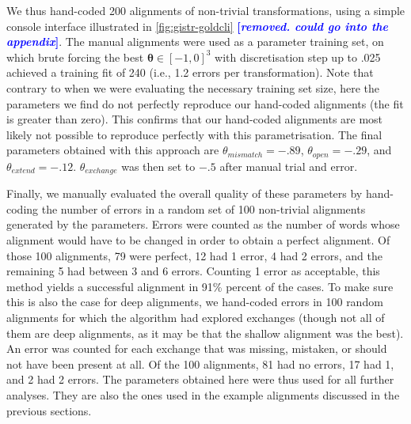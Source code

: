 \documentclass[a4paper,fleqn]{cas-dc}
\newcommand{\tb}[1]{\textcolor{blue}{#1}}
\newcommand{\rk}[1]{\tb{{\footnotesize {\bf[\emph{#1}]}}}}
\begin{document}
We thus hand-coded 200 alignments of non-trivial transformations, using
a simple console interface illustrated in \cref{fig:gistr-goldcli}
\rk{removed. could go into the appendix}.
The
manual alignments were used as a parameter training set, on which brute
forcing the best \(\bm{\theta} \in [-1, 0]^3\) with discretisation step
up to .025 achieved a training fit of 240 (i.e., 1.2 errors per
transformation). Note that contrary to when we were evaluating the
necessary training set size, here the parameters we find do not
perfectly reproduce our hand-coded alignments (the fit is greater than
zero). This confirms that our hand-coded alignments are most likely not
possible to reproduce perfectly with this parametrisation. The final
parameters obtained with this approach are \(\theta_{mismatch} = -.89\),
\(\theta_{open} = -.29\), and \(\theta_{extend} = -.12\).
\(\theta_{exchange}\) was then set to \(-.5\) after manual trial and
error.

%

Finally, we manually evaluated the overall quality of these parameters
by hand-coding the number of errors in a random set of 100 non-trivial
alignments generated by the parameters. Errors were counted as the
number of words whose alignment would have to be changed in order to
obtain a perfect alignment. Of those 100 alignments, 79 were perfect, 12
had 1 error, 4 had 2 errors, and the remaining 5 had between 3 and 6
errors. Counting 1 error as acceptable, this method yields a successful
alignment in 91\% percent of the cases. To make sure this is also the
case for deep alignments, we hand-coded errors in 100 random alignments
for which the algorithm had explored exchanges (though not all of them
are deep alignments, as it may be that the shallow alignment was the
best). An error was counted for each exchange that was missing,
mistaken, or should not have been present at all. Of the 100 alignments,
81 had no errors, 17 had 1, and 2 had 2 errors. The parameters obtained
here were thus used for all further analyses. They are also the ones
used in the example alignments discussed in the previous sections.
\end{document}

